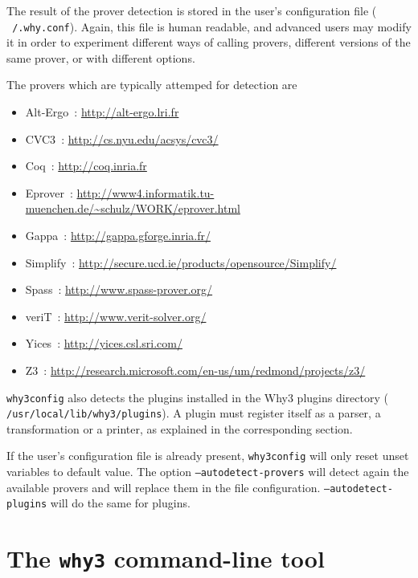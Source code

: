 The result of the prover detection is stored in the user's
configuration file (\eg{} \texttt{~/.why.conf}). Again, this file is
human readable, and advanced users may modify it in order to
experiment different ways of calling provers, \eg{} different versions
of the same prover, or with different options.

The provers which are typically attemped for detection are
\begin{itemize}
\item Alt-Ergo~\cite{conchon08smt,ergo}: \url{http://alt-ergo.lri.fr}
\item CVC3~\cite{BarTin-CAV-07}: \url{http://cs.nyu.edu/acsys/cvc3/}
\item Coq~\cite{CoqArt}: \url{http://coq.inria.fr}
\item Eprover~\cite{schulz04ijcar}: \url{http://www4.informatik.tu-muenchen.de/~schulz/WORK/eprover.html}
\item Gappa~\cite{melquiond08rnc}: \url{http://gappa.gforge.inria.fr/}
\item Simplify~\cite{simplify05}: \url{http://secure.ucd.ie/products/opensource/Simplify/}
\item Spass~: \url{http://www.spass-prover.org/}
\item veriT~: \url{http://www.verit-solver.org/}
\item Yices~\cite{DM06}: \url{http://yices.csl.sri.com/}
\item Z3~\cite{z3}: \url{http://research.microsoft.com/en-us/um/redmond/projects/z3/}
\end{itemize}

\texttt{why3config} also detects the plugins installed in the Why3
plugins directory (\eg{} \texttt{/usr/local/lib/why3/plugins}). A
plugin must register itself as a parser, a transformation or a
printer, as explained in the corresponding section.

If the user's configuration file is already present,
\texttt{why3config} will only reset unset variables to default value.
The option \texttt{--autodetect-provers} will detect again the available
provers and will replace them in the file configuration.
\texttt{--autodetect-plugins} will do the same for plugins.

\section{The \texttt{why3} command-line tool}
\label{sec:why3ref}

